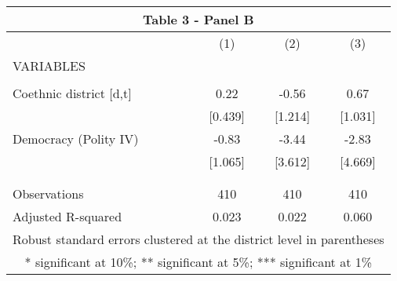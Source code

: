 \begin{tabular}{lccc}
\multicolumn{4}{c}{Table 3 - Panel B} \\ \hline
 & (1) & (2) & (3) \\
VARIABLES &  &  &  \\ \hline
 &  &  &  \\
Coethnic district [d,t] & 0.22 & -0.56 & 0.67 \\
 & [0.439] & [1.214] & [1.031] \\
Democracy (Polity IV) & -0.83 & -3.44 & -2.83 \\
 & [1.065] & [3.612] & [4.669] \\
 &  &  &  \\
 &  &  &  \\
Observations & 410 & 410 & 410 \\
 Adjusted R-squared & 0.023 & 0.022 & 0.060 \\ \hline
\multicolumn{4}{c}{ Robust standard errors clustered at the district level in parentheses} \\
\multicolumn{4}{c}{ * significant at 10\%; ** significant at 5\%; *** significant at 1\%} \\
\end{tabular}
